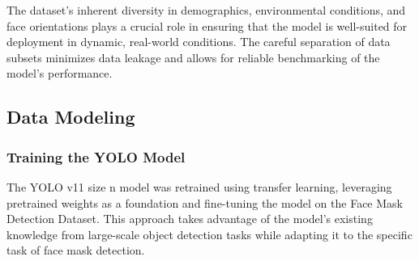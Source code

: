 \documentclass[11pt]{article}
\begin{document}
The dataset's inherent diversity in demographics, environmental conditions, and face orientations plays a crucial role in ensuring that the model is well-suited for deployment in dynamic, real-world conditions. The careful separation of data subsets minimizes data leakage and allows for reliable benchmarking of the model’s performance.

\subsection{Data Modeling}
\subsubsection{Training the YOLO Model}
The YOLO v11 size n model was retrained using transfer learning, leveraging pretrained weights as a foundation and fine-tuning the model on the Face Mask Detection Dataset. This approach takes advantage of the model’s existing knowledge from large-scale object detection tasks while adapting it to the specific task of face mask detection.
\end{document}
